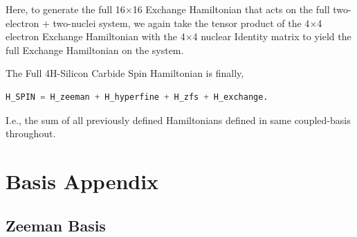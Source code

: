\documentclass[svgnames]{article}
\begin{document}
Here, to generate the full 16$\times$16 Exchange Hamiltonian that acts on the
full two-electron $+$ two-nuclei system, we again take the tensor product of the
4$\times$4 electron Exchange Hamiltonian with the  4$\times$4 nuclear Identity
matrix to yield the full Exchange Hamiltonian on the system. 

\vfill 
The Full 4H-Silicon Carbide Spin Hamiltonian is finally, 

\begin{lstlisting}[language=Python] 
H_SPIN = H_zeeman + H_hyperfine + H_zfs + H_exchange.
\end{lstlisting}

I.e., the sum of all previously defined Hamiltonians defined in same
coupled-basis throughout. 
\vfill

\section{Basis Appendix} \label{Basis} 

\subsection{Zeeman Basis}
\end{document}
